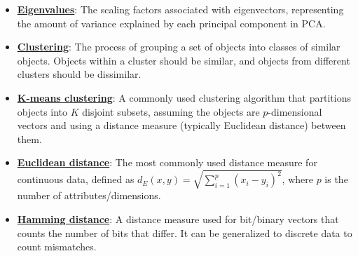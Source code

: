 \documentclass{article}%
\begin{document}
\begin{itemize}[leftmargin=*]
\item \href{https://purdue.brightspace.com/d2l/common/assets/pdfjs-d2l-dist/1.0.14-legacy/web/viewer.html?file=\%2Fcontent\%2Fenforced\%2F1095467-wl.202510.CS.24300.001\%2F11L2-svd-pca-recommender.pdf\%3Fou\%3D1095467\&lang=en-us\&container=d2l-fileviewer-rendered-pdf\&fullscreen=d2l-fileviewer-rendered-pdf-dialog\&height=667#page=17}{\textbf{Eigenvalues}}: The scaling factors associated with eigenvectors, representing the amount of variance explained by each principal component in PCA.%
\item \href{https://purdue.brightspace.com/d2l/common/assets/pdfjs-d2l-dist/1.0.14-legacy/web/viewer.html?file=\%2Fcontent\%2Fenforced\%2F1095467-wl.202510.CS.24300.001\%2F12L2-distance-clusters.pdf\%3Fou\%3D1095467\&lang=en-us\&container=d2l-fileviewer-rendered-pdf\&fullscreen=d2l-fileviewer-rendered-pdf-dialog\&height=667#page=4}{\textbf{Clustering}}: The process of grouping a set of objects into classes of similar objects. Objects within a cluster should be similar, and objects from different clusters should be dissimilar.%
\item \href{https://purdue.brightspace.com/d2l/common/assets/pdfjs-d2l-dist/1.0.14-legacy/web/viewer.html?file=\%2Fcontent\%2Fenforced\%2F1095467-wl.202510.CS.24300.001\%2F12L2-distance-clusters.pdf\%3Fou\%3D1095467\&lang=en-us\&container=d2l-fileviewer-rendered-pdf\&fullscreen=d2l-fileviewer-rendered-pdf-dialog\&height=667#page=21}{\textbf{K-means clustering}}: A commonly used clustering algorithm that partitions objects into $K$ disjoint subsets, assuming the objects are $p$-dimensional vectors and using a distance measure (typically Euclidean distance) between them.%
\item \href{https://purdue.brightspace.com/d2l/common/assets/pdfjs-d2l-dist/1.0.14-legacy/web/viewer.html?file=\%2Fcontent\%2Fenforced\%2F1095467-wl.202510.CS.24300.001\%2F12L2-distance-clusters.pdf\%3Fou\%3D1095467\&lang=en-us\&container=d2l-fileviewer-rendered-pdf\&fullscreen=d2l-fileviewer-rendered-pdf-dialog\&height=667#page=17}{\textbf{Euclidean distance}}: The most commonly used distance measure for continuous data, defined as $d_E(x, y) = \sqrt{\sum_{i=1}^p (x_i - y_i)^2}$, where $p$ is the number of attributes/dimensions.%
\item \href{https://purdue.brightspace.com/d2l/common/assets/pdfjs-d2l-dist/1.0.14-legacy/web/viewer.html?file=\%2Fcontent\%2Fenforced\%2F1095467-wl.202510.CS.24300.001\%2F12L2-distance-clusters.pdf\%3Fou\%3D1095467\&lang=en-us\&container=d2l-fileviewer-rendered-pdf\&fullscreen=d2l-fileviewer-rendered-pdf-dialog\&height=667#page=19}{\textbf{Hamming distance}}: A distance measure used for bit/binary vectors that counts the number of bits that differ. It can be generalized to discrete data to count mismatches.%

\end{itemize}
\end{document}
